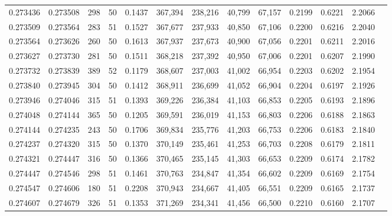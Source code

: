 \begin{tabular}{rrrrrrrrrrrrr}
0.273436 & 0.273508 &   298 &  50 &                                     0.1437 & 367,394 & 238,216 &  40,799 &  67,157 & 0.2199 & 0.6221 & 2.2066 \\
0.273509 & 0.273564 &   283 &  51 &                                     0.1527 & 367,677 & 237,933 &  40,850 &  67,106 & 0.2200 & 0.6216 & 2.2040 \\
0.273564 & 0.273626 &   260 &  50 &                                     0.1613 & 367,937 & 237,673 &  40,900 &  67,056 & 0.2201 & 0.6211 & 2.2016 \\
0.273627 & 0.273730 &   281 &  50 &                                     0.1511 & 368,218 & 237,392 &  40,950 &  67,006 & 0.2201 & 0.6207 & 2.1990 \\
0.273732 & 0.273839 &   389 &  52 &                                     0.1179 & 368,607 & 237,003 &  41,002 &  66,954 & 0.2203 & 0.6202 & 2.1954 \\
0.273840 & 0.273945 &   304 &  50 &                                     0.1412 & 368,911 & 236,699 &  41,052 &  66,904 & 0.2204 & 0.6197 & 2.1926 \\
0.273946 & 0.274046 &   315 &  51 &                                     0.1393 & 369,226 & 236,384 &  41,103 &  66,853 & 0.2205 & 0.6193 & 2.1896 \\
0.274048 & 0.274144 &   365 &  50 &                                     0.1205 & 369,591 & 236,019 &  41,153 &  66,803 & 0.2206 & 0.6188 & 2.1863 \\
0.274144 & 0.274235 &   243 &  50 &                                     0.1706 & 369,834 & 235,776 &  41,203 &  66,753 & 0.2206 & 0.6183 & 2.1840 \\
0.274237 & 0.274320 &   315 &  50 &                                     0.1370 & 370,149 & 235,461 &  41,253 &  66,703 & 0.2208 & 0.6179 & 2.1811 \\
0.274321 & 0.274447 &   316 &  50 &                                     0.1366 & 370,465 & 235,145 &  41,303 &  66,653 & 0.2209 & 0.6174 & 2.1782 \\
0.274447 & 0.274546 &   298 &  51 &                                     0.1461 & 370,763 & 234,847 &  41,354 &  66,602 & 0.2209 & 0.6169 & 2.1754 \\
0.274547 & 0.274606 &   180 &  51 &                                     0.2208 & 370,943 & 234,667 &  41,405 &  66,551 & 0.2209 & 0.6165 & 2.1737 \\
0.274607 & 0.274679 &   326 &  51 &                                     0.1353 & 371,269 & 234,341 &  41,456 &  66,500 & 0.2210 & 0.6160 & 2.1707 \\

\end{tabular}
